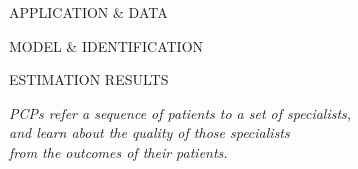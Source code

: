 \documentclass[slides, aspectratio=169]{beamer}
\begin{document}

\begin{frame}

\vskip36pt

\begin{center}
\LARGE

\color{lightgray}
APPLICATION \& DATA

\color{heritageblue}
MODEL \& IDENTIFICATION

\color{lightgray}
ESTIMATION RESULTS

\bigskip \bigskip \pause

\color{black} \small

\emph{PCPs refer a sequence of patients to a set of specialists, \\ and learn about the quality of those specialists \\ from the outcomes of their patients.}

\end{center}

\end{frame}

\end{document}
